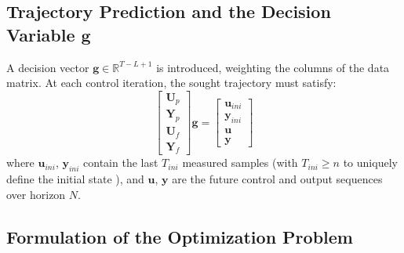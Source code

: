 \subsection{Trajectory Prediction and the Decision Variable $\boldsymbol{g}$}

A decision vector $\boldsymbol{g} \in \mathbb{R}^{T-L+1}$ is introduced, weighting the columns of the data matrix. At each control iteration, the sought trajectory must satisfy:
\begin{equation}
\label{eq:deePC_regression}
\begin{bmatrix}
    \boldsymbol{U}_p \\
    \boldsymbol{Y}_p \\
    \boldsymbol{U}_f \\
    \boldsymbol{Y}_f
    \end{bmatrix}
    \boldsymbol{g} =
    \begin{bmatrix}
    \boldsymbol{u}_{ini} \\
    \boldsymbol{y}_{ini} \\
    \boldsymbol{u} \\
    \boldsymbol{y}
    \end{bmatrix}
\end{equation}
where $\boldsymbol{u}_{ini}$, $\boldsymbol{y}_{ini}$ contain the last $T_{ini}$ measured samples (with $T_{ini} \ge n$ to uniquely define the initial state \cite{ethzurich}), and $\boldsymbol{u}$, $\boldsymbol{y}$ are the future control and output sequences over horizon $N$.

\subsection{Formulation of the Optimization Problem}

